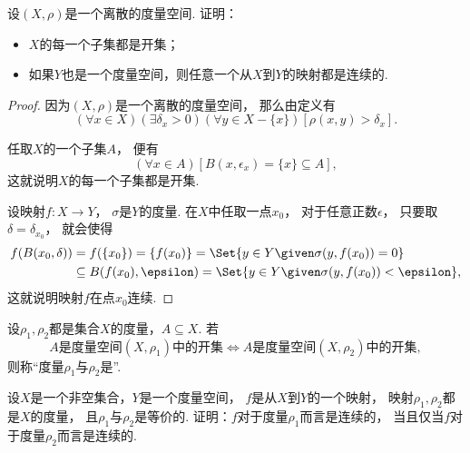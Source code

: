 
\begin{example}
设\((X,\rho)\)是一个离散的度量空间.
证明：\begin{itemize}
	\item \(X\)的每一个子集都是开集；
	\item 如果\(Y\)也是一个度量空间，则任意一个从\(X\)到\(Y\)的映射都是连续的.
\end{itemize}
\begin{proof}
因为\((X,\rho)\)是一个离散的度量空间，
那么由定义有\begin{equation*}
	(\forall x \in X)
	(\exists \delta_x > 0)
	(\forall y \in X - \{x\})
	[\rho(x,y) > \delta_x].
\end{equation*}

任取\(X\)的一个子集\(A\)，
便有\begin{equation*}
	(\forall x \in A)
	[B(x,\epsilon_x) = \{x\} \subseteq A],
\end{equation*}
这就说明\(X\)的每一个子集都是开集.

设映射\(f\colon X \to Y\)，
\(\sigma\)是\(Y\)的度量.
在\(X\)中任取一点\(x_0\)，
对于任意正数\(\epsilon\)，
只要取\(\delta = \delta_{x_0}\)，
就会使得\begin{align*}
	f(B(x_0,\delta))
	&= f(\{x_0\})
	= \{f(x_0)\}
	= \Set{ y \in Y \given \sigma(y,f(x_0)) = 0 } \\
	&\subseteq
	B(f(x_0),\epsilon)
	= \Set{ y \in Y \given \sigma(y,f(x_0)) < \epsilon },
\end{align*}
这就说明映射\(f\)在点\(x_0\)连续.
\end{proof}
\end{example}

\begin{definition}
设\(\rho_1,\rho_2\)都是集合\(X\)的度量，\(A \subseteq X\).
若\begin{equation*}
	\text{\(A\)是度量空间\((X,\rho_1)\)中的开集}
	\iff
	\text{\(A\)是度量空间\((X,\rho_2)\)中的开集},
\end{equation*}
则称“度量\(\rho_1\)与\(\rho_2\)是”.
\end{definition}

\begin{example}
设\(X\)是一个非空集合，\(Y\)是一个度量空间，
\(f\)是从\(X\)到\(Y\)的一个映射，
映射\(\rho_1,\rho_2\)都是\(X\)的度量，
且\(\rho_1\)与\(\rho_2\)是等价的.
证明：\(f\)对于度量\(\rho_1\)而言是连续的，
当且仅当\(f\)对于度量\(\rho_2\)而言是连续的.
\end{example}

